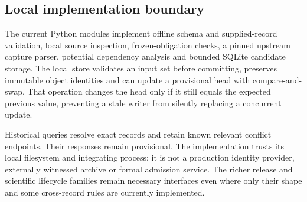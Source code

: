 \subsection{Local implementation boundary}

The current Python modules implement offline schema and supplied-record validation, local source inspection, frozen-obligation checks, a pinned upstream capture parser, potential dependency analysis and bounded SQLite candidate storage. The local store validates an input set before committing, preserves immutable object identities and can update a provisional head with compare-and-swap. That operation changes the head only if it still equals the expected previous value, preventing a stale writer from silently replacing a concurrent update.

Historical queries resolve exact records and retain known relevant conflict endpoints. Their responses remain provisional. The implementation trusts its local filesystem and integrating process; it is not a production identity provider, externally witnessed archive or formal admission service. The richer release and scientific lifecycle families remain necessary interfaces even where only their shape and some cross-record rules are currently implemented.

